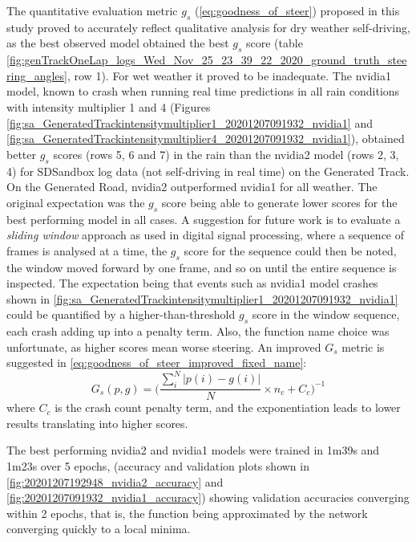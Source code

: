 The quantitative evaluation metric $g_s$ (\ref{eq:goodness_of_steer}) proposed in this study proved to accurately reflect qualitative analysis for dry weather self-driving, as the best observed model obtained the best $g_s$ score (table  \ref{fig:genTrackOneLap_logs_Wed_Nov_25_23_39_22_2020_ground_truth_steering_angles}, row 1). For wet weather it proved to be inadequate. 
The nvidia1 model, known to crash when running real time predictions in all rain conditions with intensity multiplier 1 and 4 (Figures
\ref{fig:sa_GeneratedTrackintensitymultiplier1_20201207091932_nvidia1} and  \ref{fig:sa_GeneratedTrackintensitymultiplier4_20201207091932_nvidia1}), obtained better $g_s$ scores (rows 5, 6 and 7) in the rain than the nvidia2 model (rows 2, 3, 4) for SDSandbox log data (not self-driving in real time) on the Generated Track. On the Generated Road, nvidia2 outperformed nvidia1 for all weather. The original expectation was the $g_s$ score being able to generate lower scores for the best performing model in all cases. A suggestion for future work is to evaluate a \textit{sliding window} approach as used in digital signal processing, where a sequence of frames is analysed at a time, the $g_s$ score for the sequence could then be noted, the window moved forward by one frame, and so on until the entire sequence is inspected. The expectation being that events such as nvidia1 model crashes shown in \ref{fig:sa_GeneratedTrackintensitymultiplier1_20201207091932_nvidia1} could be quantified by a higher-than-threshold $g_s$ score in the window sequence, each crash adding up into a penalty term. Also, the function name choice was unfortunate, as higher scores mean worse steering. An improved $G_s$ metric is suggested in \ref{eq:goodness_of_steer_improved_fixed_name}:
\begin{equation}
    \label{eq:goodness_of_steer_improved_fixed_name}
    G_s(p,g) = \Bigg(\frac{\sum_i^N \lvert p(i)-g(i) \rvert }{N} \times n_c + C_c\Bigg)^{-1}
\end{equation}
where $C_c$ is the crash count penalty term, and the exponentiation leads to lower results translating into higher scores.

The best performing nvidia2 and nvidia1 models were trained in 1m39s and 1m23s over 5 epochs, (accuracy and validation plots shown in \ref{fig:20201207192948_nvidia2_accuracy} and \ref{fig:20201207091932_nvidia1_accuracy}) showing validation accuracies converging within 2 epochs, that is, the function being approximated by the network converging quickly to a local minima. 


